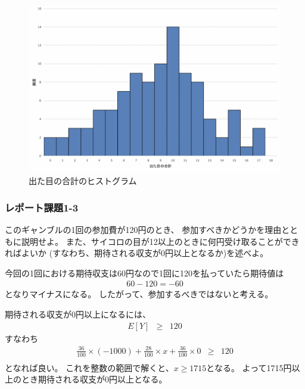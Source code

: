 \documentclass[12pt]{jarticle}
\begin{document}
\clearpage
\begin{figure}[h]
    \begin{center}
        \includegraphics[scale=0.7]{kadai4_graph2.png}
    \end{center}
    \caption{出た目の合計のヒストグラム}
    \label{fig2}
\end{figure}

\subsubsection*{レポート課題1-3}
\begin{shadebox}
    このギャンブルの1回の参加費が120円のとき、
    参加すべきかどうかを理由とともに説明せよ。
    また、サイコロの目が12以上のときに何円受け取ることができればよいか
    (すなわち、期待される収支が0円以上となるか)を述べよ。
\end{shadebox}

今回の1回における期待収支は60円なので1回に120を払っていたら期待値は
\begin{eqnarray}
    60 - 120 = -60 \nonumber
\end{eqnarray}
となりマイナスになる。
したがって、参加するべきではないと考える。

期待される収支が0円以上になるには、
\begin{eqnarray}
    E[Y] &\geq& 120
\end{eqnarray}
すなわち
\begin{eqnarray}
    \frac{36}{100}×(-1000) + \frac{28}{100}×x + \frac{36}{100}×0 &\geq& 120 \nonumber\\
\end{eqnarray}
となれば良い。
これを整数の範囲で解くと、$x\geq1715$となる。
よって1715円以上のとき期待される収支が0円以上となる。
\clearpage
\end{document}
